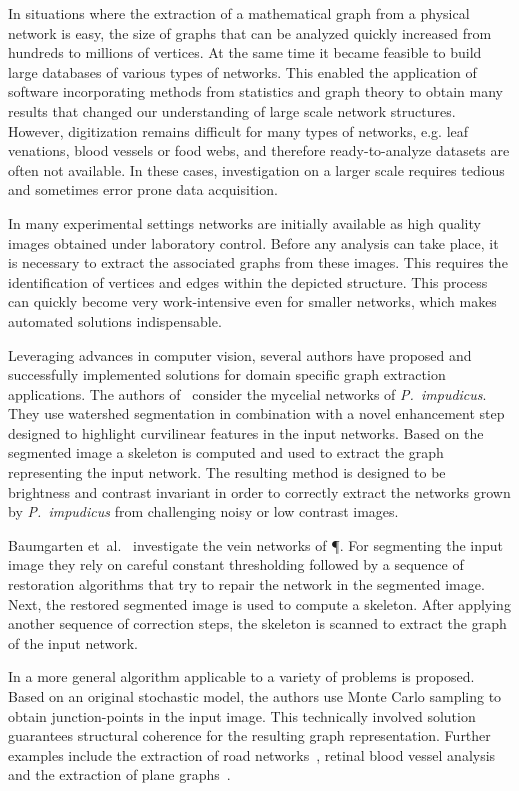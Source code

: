 	In situations where the extraction of a mathematical graph from a physical network is easy, the size of graphs that can be analyzed quickly increased from hundreds to millions of vertices. At the same time it became feasible to build large databases of various types of networks. This enabled the application of software incorporating methods from statistics and graph theory to obtain many results that changed our understanding of large scale network structures. However, digitization remains difficult for many types of networks, e.g. leaf venations, blood vessels or food webs, and therefore ready-to-analyze datasets are often not available. In these cases, investigation on a larger scale requires tedious and sometimes error prone data acquisition.

	In many experimental settings networks are initially available as high quality images obtained under laboratory control. Before any analysis can take place, it is necessary to extract the associated graphs from these images. This requires the identification of vertices and edges within the depicted structure. This process can quickly become very work-intensive even for smaller networks, which makes automated solutions indispensable. 

	Leveraging advances in computer vision, several authors have proposed and successfully implemented solutions for domain specific graph extraction applications. The authors of~\cite{obara2012bioimage,obara2012contrast} consider the mycelial networks of \emph{P.\ impudicus}. They use	watershed segmentation in combination with a novel enhancement step designed to highlight curvilinear features in the input networks. Based on the segmented image a skeleton is computed and used to extract the graph representing the input network.	The resulting method is designed to be brightness and contrast invariant in order to correctly extract the networks grown by \emph{P.\ impudicus} from challenging noisy or low contrast images.
	
	Baumgarten et~al.~\cite{baumgarten2010detection,baumgarten2012computational} investigate the vein networks of \P. For segmenting the input image they rely on careful constant thresholding followed by a sequence of restoration algorithms that try to repair the network in the segmented image. Next, the restored segmented image is used to compute a skeleton. After	applying another sequence of correction steps, the skeleton is scanned to extract the graph of the input network.
 
	In \cite{chai2013recovering} a more general algorithm applicable to a variety of problems is proposed. Based on an original stochastic model, the authors use Monte Carlo sampling to obtain junction-points in the input image. This technically involved solution guarantees structural coherence for the resulting graph representation. Further examples include the extraction of road networks~\cite{nglt2006}, retinal blood vessel analysis~\cite{krause2013fast} and the extraction of plane graphs~\cite{hewrw2010}.

